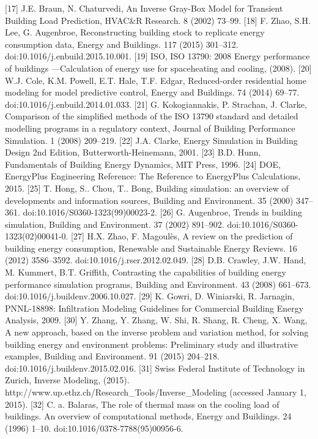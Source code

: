 [17]	J.E. Braun, N. Chaturvedi, An Inverse Gray-Box Model for Transient Building Load Prediction, HVAC&R Research. 8 (2002) 73–99.
[18]	F. Zhao, S.H. Lee, G. Augenbroe, Reconstructing building stock to replicate energy consumption data, Energy and Buildings. 117 (2015) 301–312. doi:10.1016/j.enbuild.2015.10.001.
[19]	ISO, ISO 13790: 2008 Energy performance of buildings —Calculation of energy use for spaceheating and cooling, (2008).
[20]	W.J. Cole, K.M. Powell, E.T. Hale, T.F. Edgar, Reduced-order residential home modeling for model predictive control, Energy and Buildings. 74 (2014) 69–77. doi:10.1016/j.enbuild.2014.01.033.
[21]	G. Kokogiannakis, P. Strachan, J. Clarke, Comparison of the simplified methods of the ISO 13790 standard and detailed modelling programs in a regulatory context, Journal of Building Performance Simulation. 1 (2008) 209–219.
[22]	J.A. Clarke, Energy Simulation in Building Design 2nd Edition, Butterworth-Heinemann, 2001.
[23]	B.D. Hunn, Fundamentals of Building Energy Dynamics, MIT Press, 1996.
[24]	DOE, EnergyPlus Engineering Reference: The Reference to EnergyPlus Calculations, 2015.
[25]	T. Hong, S.. Chou, T.. Bong, Building simulation: an overview of developments and information sources, Building and Environment. 35 (2000) 347–361. doi:10.1016/S0360-1323(99)00023-2.
[26]	G. Augenbroe, Trends in building simulation, Building and Environment. 37 (2002) 891–902. doi:10.1016/S0360-1323(02)00041-0.
[27]	H.X. Zhao, F. Magoulès, A review on the prediction of building energy consumption, Renewable and Sustainable Energy Reviews. 16 (2012) 3586–3592. doi:10.1016/j.rser.2012.02.049.
[28]	D.B. Crawley, J.W. Hand, M. Kummert, B.T. Griffith, Contrasting the capabilities of building energy performance simulation programs, Building and Environment. 43 (2008) 661–673. doi:10.1016/j.buildenv.2006.10.027.
[29]	K. Gowri, D. Winiarski, R. Jarnagin, PNNL-18898: Infiltration Modeling Guidelines for Commercial Building Energy Analysis, 2009.
[30]	Y. Zhang, Y. Zhang, W. Shi, R. Shang, R. Cheng, X. Wang, A new approach, based on the inverse problem and variation method, for solving building energy and environment problems: Preliminary study and illustrative examples, Building and Environment. 91 (2015) 204–218. doi:10.1016/j.buildenv.2015.02.016.
[31]	Swiss Federal Institute of Technology in Zurich, Inverse Modeling, (2015). http://www.up.ethz.ch/Research_Tools/Inverse_Modeling (accessed January 1, 2015).
[32]	C. a. Balaras, The role of thermal mass on the cooling load of buildings. An overview of computational methods, Energy and Buildings. 24 (1996) 1–10. doi:10.1016/0378-7788(95)00956-6.
